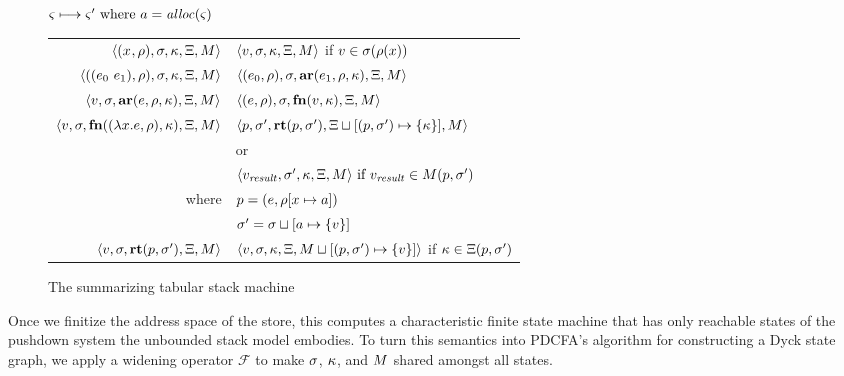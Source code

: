 \documentclass{llncs}
\begin{document}
\begin{figure}
  \centering
  $\varsigma \longmapsto \varsigma' \text{ where } a = \mathit{alloc}(\varsigma)$ \\
  \begin{tabular}{r|l}
    \hline
    $\langle (x^{{}}, \rho), \sigma, \kappa, \Xi, M \rangle$
    &
    $\langle v,\sigma,\kappa, \Xi, M \rangle$ if $v \in \sigma(\rho(x))$
    \\
    $\langle ((e_{0}\ e_{1}){}, \rho), \sigma, \kappa, \Xi, M \rangle$
    &
    $\langle (e_{0}, \rho), \sigma, \mathbf{ar}{}(e_{1},\rho,\kappa), \Xi, M \rangle$
    \\
    $\langle v, \sigma, \mathbf{ar}{}(e,\rho,\kappa), \Xi, M \rangle$
    &
    $\langle (e, \rho), \sigma, \mathbf{fn}{}(v, \kappa), \Xi, M \rangle$
    \\
    $\langle v,\sigma,\mathbf{fn}{}((\lambda{} x. e, \rho), \kappa),\Xi,M \rangle$
    & %
    $\langle p,
          \sigma',
          \mathbf{rt}(p, \sigma'),
          \Xi\sqcup[(p, \sigma') \mapsto \{ \kappa \}],
          M \rangle$
\\
    & or \\
    & $\langle v_\mathit{result}, \sigma', \kappa, \Xi, M \rangle \text{ if } v_\mathit{result} \in M(p,\sigma')$
    \\ %
    where & $p = (e, \rho[x \mapsto a])$ \\
          & $\sigma' = \sigma\sqcup[a \mapsto \{ v \}]$
    \\
    $\langle v, \sigma, \mathbf{rt}(p,\sigma'), \Xi, M \rangle$
    &
    $\langle v, \sigma, \kappa, \Xi, M\sqcup[(p, \sigma') \mapsto \{ v \}] \rangle$
    if $\kappa \in \Xi(p, \sigma')$
  \end{tabular}
  \caption{The summarizing tabular stack machine}
  \label{fig:summary-semantics}
\end{figure}

Once we finitize the address space of the store, this computes a
characteristic finite state machine that has only reachable states of
the pushdown system the unbounded stack model embodies.  To turn this
semantics into PDCFA's algorithm for constructing a Dyck state graph,
we apply a widening operator ${\mathcal F}$ to make $\sigma$,
$\kappa$, and $M$ shared amongst all states.
\end{document}
